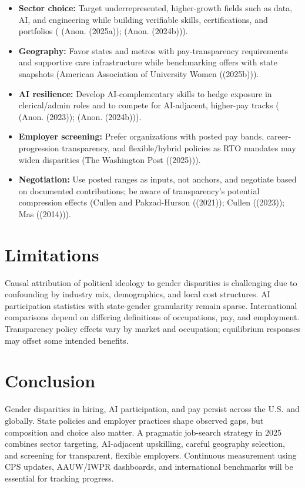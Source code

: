 \documentclass[
  letterpaper,
  DIV=11,
  numbers=noendperiod]{scrartcl}
\providecommand{\tightlist}{%
  \setlength{\itemsep}{0pt}\setlength{\parskip}{0pt}}\usepackage{longtable,booktabs,array}
\begin{document}
\begin{itemize}
\tightlist
\item
  \textbf{Sector choice:} Target underrepresented, higher-growth fields
  such as data, AI, and engineering while building verifiable skills,
  certifications, and portfolios ( (Anon. (2025a)); (Anon. (2024b))).
\item
  \textbf{Geography:} Favor states and metros with pay-transparency
  requirements and supportive care infrastructure while benchmarking
  offers with state snapshots (American Association of University Women
  ((2025b))).
\item
  \textbf{AI resilience:} Develop AI-complementary skills to hedge
  exposure in clerical/admin roles and to compete for AI-adjacent,
  higher-pay tracks ( (Anon. (2023)); (Anon. (2024b))).
\item
  \textbf{Employer screening:} Prefer organizations with posted pay
  bands, career-progression transparency, and flexible/hybrid policies
  as RTO mandates may widen disparities (The Washington Post ((2025))).
\item
  \textbf{Negotiation:} Use posted ranges as inputs, not anchors, and
  negotiate based on documented contributions; be aware of
  transparency's potential compression effects (Cullen and Pakzad-Hurson
  ((2021)); Cullen ((2023)); Mas ((2014))).
\end{itemize}

\section{Limitations}\label{limitations}

Causal attribution of political ideology to gender disparities is
challenging due to confounding by industry mix, demographics, and local
cost structures. AI participation statistics with state-gender
granularity remain sparse. International comparisons depend on differing
definitions of occupations, pay, and employment. Transparency policy
effects vary by market and occupation; equilibrium responses may offset
some intended benefits.

\section{Conclusion}\label{conclusion}

Gender disparities in hiring, AI participation, and pay persist across
the U.S. and globally. State policies and employer practices shape
observed gaps, but composition and choice also matter. A pragmatic
job-search strategy in 2025 combines sector targeting, AI-adjacent
upskilling, careful geography selection, and screening for transparent,
flexible employers. Continuous measurement using CPS updates, AAUW/IWPR
dashboards, and international benchmarks will be essential for tracking
progress.
\end{document}
